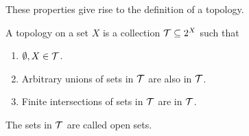 These properties give rise to the definition of a topology.

\begin{definition}[Topology]
    A topology on a set $X$ is a collection $\mathcal T \subseteq 2^X$ such that \begin{enumerate}
        \item $\emptyset, X \in \mathcal T$.
        \item Arbitrary unions of sets in $\mathcal T$ are also in $\mathcal T$.
        \item Finite intersections of sets in $\mathcal T$ are in $\mathcal T$.
    \end{enumerate}

    The sets in $\mathcal T$ are called open sets.
\end{definition}

